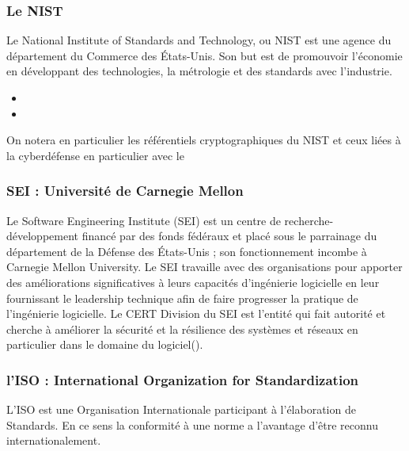 \subsubsection{Le NIST}
Le National Institute of Standards and Technology, ou NIST est une agence du département du Commerce des États-Unis. Son but est de promouvoir l'économie en développant des technologies, la métrologie et des standards avec l'industrie. 

\begin{itemize}
  \item {}
  \item {}
\end{itemize}

On notera en particulier les référentiels cryptographiques du NIST et ceux liées à la cyberdéfense en particulier avec le 

\subsubsection{SEI : Université de Carnegie Mellon}

Le Software Engineering Institute (SEI) est un centre de recherche-développement financé par des fonds fédéraux et placé sous le parrainage du département de la Défense des États-Unis ; son fonctionnement incombe à Carnegie Mellon University. Le SEI travaille avec des organisations pour apporter des améliorations significatives à leurs capacités d’ingénierie logicielle en leur fournissant le leadership technique afin de faire progresser la pratique de l’ingénierie logicielle. Le CERT Division du SEI est l’entité qui fait autorité et cherche à améliorer la sécurité et la résilience des systèmes et réseaux en particulier dans le domaine du logiciel().

\subsubsection{l'ISO : International Organization for Standardization }


L’ISO est une Organisation Internationale participant à l’élaboration de Standards. En ce sens la conformité à une norme a l’avantage d’être reconnu internationalement.
 
